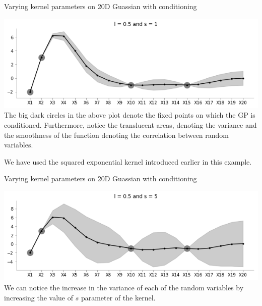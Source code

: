 \documentclass{beamer}
\begin{document}
\begin{frame}{Varying kernel parameters on 20D Guassian with conditioning}
	\begin{center}
		\includegraphics[width=\linewidth, height=\textheight -120pt ,keepaspectratio]{gp/kernel/20gp_ker1}\\
		The big dark circles in the above plot denote the fixed points on which the GP is conditioned. Furthermore, notice the translucent areas, denoting the variance and the smoothness of the function denoting the correlation between random variables.
		
		We have used the squared exponential kernel introduced earlier in this example.
	\end{center}
\end{frame}

\begin{frame}{Varying kernel parameters on 20D Guassian with conditioning}
	\begin{center}
		\includegraphics[width=\linewidth, height=\textheight -120pt ,keepaspectratio]{gp/kernel/20gp_ker2}\\
		We can notice the increase in the variance of each of the random variables by increasing the value of $s$ parameter of the kernel.
	\end{center}
\end{frame}
\end{document}
